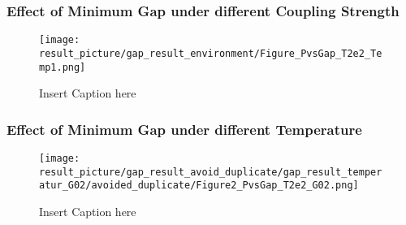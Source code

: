 \documentclass{beamer}
\begin{document}
\begin{frame}
	\frametitle{Effect of Minimum Gap under different Coupling Strength }

	\begin{figure}
		\centering
		\texttt{[image: result\_picture/gap\_result\_environment/Figure\_PvsGap\_T2e2\_Temp1.png]}
		
		\caption{Insert Caption here}
	\end{figure}
\end{frame}

\begin{frame}
	\frametitle{Effect of Minimum Gap under different Temperature }
	
	\begin{figure}
		\centering
		\texttt{[image: result\_picture/gap\_result\_avoid\_duplicate/gap\_result\_temperatur\_G02/avoided\_duplicate/Figure2\_PvsGap\_T2e2\_G02.png]}	
		\caption{Insert Caption here}
	\end{figure}
\end{frame}





\end{document}
